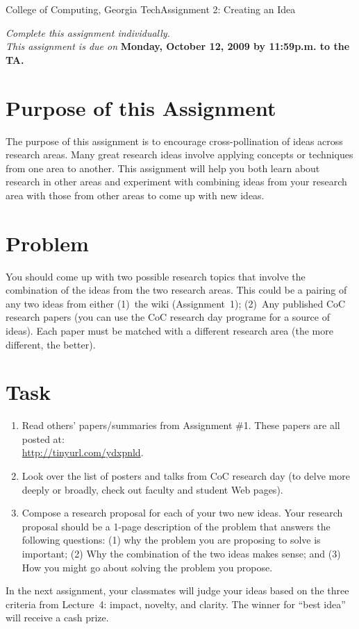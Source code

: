 \documentclass[11pt]{article}
\begin{document}


{College of Computing, Georgia Tech}{Assignment 2: Creating an Idea}

{\em Complete this assignment individually. \\  This
  assignment is due on} {\bf Monday, October 12, 2009 by 11:59p.m. to
  the TA.}

\section{Purpose of this Assignment}
The purpose of this assignment is to encourage cross-pollination of
ideas across research areas.  Many great research ideas involve applying
concepts or techniques from one area to another. This assignment will
help you both learn about research in other areas and experiment with
combining ideas from your research area with those from other areas to
come up with new ideas.

\section{Problem}

You should come up with two possible research topics that involve the
combination of the ideas from the two research areas.  This could be a
pairing of any two ideas from either (1)~the wiki (Assignment~1);
(2)~Any published CoC research papers (you can use the CoC research day
programe for a source of ideas).  Each paper must be matched with a
different research area (the more different, the better).



\section{Task}

\begin{enumerate}
\itemsep=-1pt
\item Read others' papers/summaries from Assignment \#1. These papers
  are all posted at: \\ \url{http://tinyurl.com/ydxpnld}.
%
\item Look over the list of posters and talks from CoC research day (to
  delve more deeply or broadly, check out faculty and student Web pages).
%
\item Compose a research proposal for each of your two new ideas. Your
  research proposal should be a 1-page description of the problem that
  answers the following questions: (1) why the problem you are proposing
  to solve is important; (2) Why the combination of the two ideas makes
  sense; and (3) How you might go about solving the problem you propose.
\end{enumerate}
\noindent
In the next assignment, your classmates will judge your ideas based on
the three criteria from Lecture~4: impact, novelty, and clarity.  The
winner for ``best idea'' will receive a cash prize.
\end{document}
